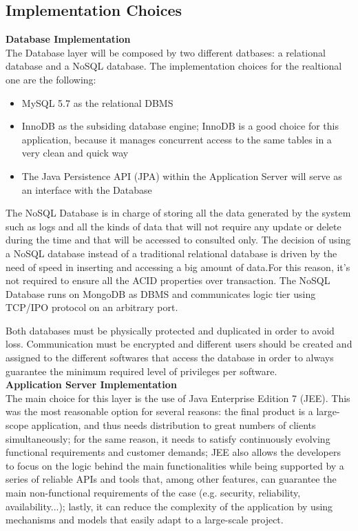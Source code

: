 
%

\subsection{Implementation Choices}
\textbf{Database Implementation}\\

The Database layer will be composed by two different datbases: a relational database and a NoSQL database. The implementation choices for the realtional one are the following:
\begin{itemize}
\item MySQL 5.7 as the relational DBMS
\item InnoDB as the subsiding database engine; InnoDB is a good choice for this application, because it manages concurrent access to the same tables in a very clean and quick way
\item The Java Persistence API (JPA) within the Application Server will serve as an interface with the Database
\end{itemize}

The NoSQL Database is in charge of storing all the data generated by the system such as logs and all the kinds of data that  will not require any update or delete during the time and that will be accessed to consulted only. The decision of using a NoSQL database instead of a traditional relational database is driven by the need of speed in inserting and accessing a big amount of data.For this reason, it's not required to ensure all the ACID properties over transaction. The NoSQL Database runs on MongoDB as DBMS and communicates logic tier using TCP/IPO protocol on an arbitrary port.

Both databases must be physically protected and duplicated in order to avoid loss. Communication must be encrypted and different users should be created and assigned to the different softwares that access the database in order to always guarantee the minimum required level of privileges per software.\\

\hspace{-\parindent}\textbf{Application Server Implementation}\\

The main choice for this layer is the use of Java Enterprise Edition 7 (JEE). This was the most reasonable option for several reasons: the final product is a large-scope application, and thus needs distribution to great numbers of clients simultaneously; for the same reason, it needs to satisfy continuously evolving functional requirements and customer demands; JEE also allows the developers to focus on the logic behind the main functionalities while being supported by a series of reliable APIs and tools that, among other features, can guarantee the main non-functional requirements of the case (e.g. security, reliability, availability...); lastly, it can reduce the complexity of the application by using mechanisms and models that easily adapt to a large-scale project. 

